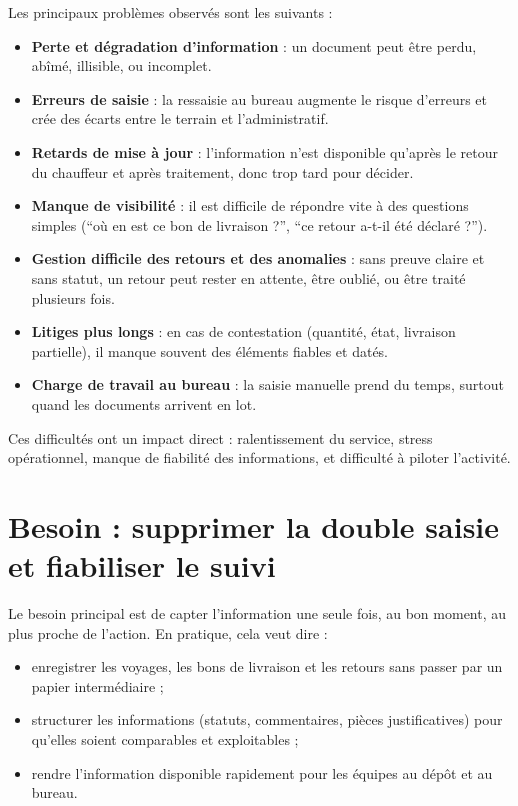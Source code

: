 \documentclass[12pt,a4paper]{article}
\begin{document}
    Les principaux problèmes observés sont les suivants :
    \begin{itemize}[leftmargin=1.2em]
    \item \textbf{Perte et dégradation d'information} : un document peut être perdu, abîmé, illisible, ou incomplet.
    \item \textbf{Erreurs de saisie} : la ressaisie au bureau augmente le risque d'erreurs et crée des écarts entre le terrain et l'administratif.
    \item \textbf{Retards de mise à jour} : l'information n'est disponible qu'après le retour du chauffeur et après traitement, donc trop tard pour décider.
    \item \textbf{Manque de visibilité} : il est difficile de répondre vite à des questions simples (``où en est ce bon de livraison ?'', ``ce retour a-t-il été déclaré ?'').
    \item \textbf{Gestion difficile des retours et des anomalies} : sans preuve claire et sans statut, un retour peut rester en attente, être oublié, ou être traité plusieurs fois.
    \item \textbf{Litiges plus longs} : en cas de contestation (quantité, état, livraison partielle), il manque souvent des éléments fiables et datés.
    \item \textbf{Charge de travail au bureau} : la saisie manuelle prend du temps, surtout quand les documents arrivent en lot.
    \end{itemize}

    Ces difficultés ont un impact direct : ralentissement du service, stress opérationnel, manque de fiabilité des informations, et difficulté à piloter l'activité.

    \section*{Besoin : supprimer la double saisie et fiabiliser le suivi}
    Le besoin principal est de capter l'information une seule fois, au bon moment, au plus proche de l'action. En pratique, cela veut dire :
    \begin{itemize}[leftmargin=1.2em]
    \item enregistrer les voyages, les bons de livraison et les retours sans passer par un papier intermédiaire ;
    \item structurer les informations (statuts, commentaires, pièces justificatives) pour qu'elles soient comparables et exploitables ;
    \item rendre l'information disponible rapidement pour les équipes au dépôt et au bureau.
    \end{itemize}
\end{document}
